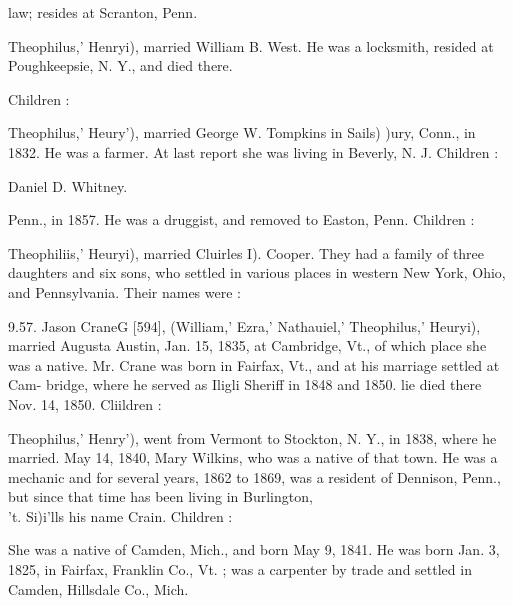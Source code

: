 \documentclass[oneside]{book}
\begin{document}
law; resides at Scranton, Penn. 


Theophilus,' Henryi), married William B. West. He was a 
locksmith, resided at Poughkeepsie, N. Y., and died there. 

Children : 



Theophilus,' Heury'), married George W. Tompkins in Sails) )ury, 
Conn., in 1832. He was a farmer. At last report she was living 
in Beverly, N. J. Children : 


Daniel D. Whitney. 













Penn., in 1857. He was a druggist, and removed to Easton, 
Penn. Children : 








Theophiliis,' Heuryi), married Cluirles I). Cooper. They had a 
family of three daughters and six sons, who settled in various 
places in western New York, Ohio, and Pennsylvania. Their 
names were : 










9.57. Jason CraneG [594], (William,' Ezra,' Nathauiel,' 
Theophilus,' Heuryi), married Augusta Austin, Jan. 15, 1835, 
at Cambridge, Vt., of which place she was a native. Mr. Crane 
was born in Fairfax, Vt., and at his marriage settled at Cam- 
bridge, where he served as Iligli Sheriff in 1848 and 1850. lie 
died there Nov. 14, 1850. Cliildren : 




Theophilus,' Henry'), went from Vermont to Stockton, N. Y., 
in 1838, where he married. May 14, 1840, Mary Wilkins, who 
was a native of that town. He was a mechanic and for several 
years, 1862 to 1869, was a resident of Dennison, Penn., but 
since that time has been living in Burlington, \\'t. Si)i'lls his 
name Crain. Children : 










She was a native of Camden, Mich., and born May 9, 1841. He 
was born Jan. 3, 1825, in Fairfax, Franklin Co., Vt. ; was a 
carpenter by trade and settled in Camden, Hillsdale Co., Mich. 
\end{document}

